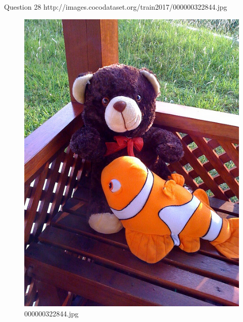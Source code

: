 Question 28
    http://images.cocodataset.org/train2017/000000322844.jpg
    \begin{figure}[h]
        \centering
        \includegraphics[width=0.8\linewidth]{../image set/easy/000000322844.jpg}
        \caption{000000322844.jpg}
    \end{figure}
